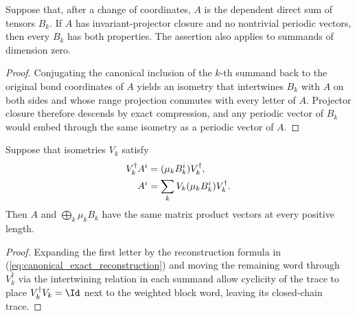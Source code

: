 \begin{lemma}
    \label{lem:canonical_hypotheses_dependent_direct_summand}
    \leanok
    Suppose that, after a change of coordinates, $A$ is the dependent direct
    sum of tensors $B_k$. If $A$ has invariant-projector closure and no
    nontrivial periodic vectors, then every $B_k$ has both properties. The
    assertion also applies to summands of dimension zero.
\end{lemma}

\begin{proof}\leanok
    Conjugating the canonical inclusion of the $k$-th summand back to the
    original bond coordinates of $A$ yields an isometry that intertwines $B_k$
    with $A$ on both sides and whose range projection commutes with every letter
    of $A$. Projector closure therefore descends by exact compression, and any
    periodic vector of $B_k$ would embed through the same isometry as a
    periodic vector of $A$.
\end{proof}

\begin{lemma}
    \label{lem:same_mpv_exact_isometric_decomposition}
    \leanok
    Suppose that isometries $V_k$ satisfy
    \begin{align}
        V_k^\dagger A^i
         & =(\mu_kB_k^i)V_k^\dagger,
        \notag                                \\
        A^i
         & =\sum_kV_k(\mu_kB_k^i)V_k^\dagger.
        \label{eq:canonical_exact_reconstruction}
    \end{align}
    Then $A$ and $\bigoplus_k\mu_kB_k$ have the same matrix product vectors
    at every positive length.
\end{lemma}

\begin{proof}\leanok
    Expanding the first letter by the reconstruction formula in
    (\ref{eq:canonical_exact_reconstruction}) and moving the remaining word
    through $V_k^\dagger$ via the intertwining relation in each summand allow
    cyclicity of the trace to place $V_k^\dagger V_k=\Id$ next to the weighted
    block word, leaving its closed-chain trace.
\end{proof}



